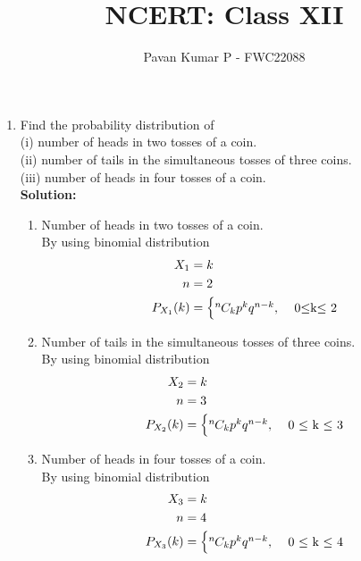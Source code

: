 \documentclass{article}
\newcommand{\solution}{\noindent \textbf{Solution: }}
\newcommand*{\permcomb}[4][0mu]{{{}^{#3}\mkern#1#2_{#4}}}
\newcommand*{\comb}[1][-1mu]{\permcomb[#1]{C}}
\begin{document}
\title{NCERT: Class XII}
\author{\Large Pavan Kumar P - FWC22088}
\date{}

\maketitle

\begin{enumerate}[label=13.\arabic{enumi}.\arabic{enumii}]

\setcounter{enumi}{3}
\setcounter{enumii}{4}

\item Find the probability distribution of\\
(i) number of heads in two tosses of a coin.\\
(ii) number of tails in the simultaneous tosses of three coins.\\
(iii) number of heads in four tosses of a coin.\\[1ex]
\solution
\begin{enumerate} 

\begin{table}[h]
 \centering
	
	\caption{Variable Description }
\end{table}
\item Number of heads in two tosses of a coin.\\
 By using binomial distribution
 \begin{align}
X_1 &= k\\ 
n &=2\\ 
  P_{X_1}(k) &=
    \begin{cases}
      \comb{n}{k}p^{k}q^{n-k}, & \text{ 0$\leq$k$\leq$ 2}\\
    \end{cases}             
\end{align}

\item Number of tails in the simultaneous tosses of three coins.\\
 By using binomial distribution\\
 \begin{align}
X_2 &= k\\ 
n&=3\\
  P_{X_2}(k) &=
    \begin{cases}
      \comb{n}{k}p^{k}q^{n-k}, & \text{ 0 $\leq$ k $\leq$ 3}\\
    \end{cases}       
\end{align}
\item Number of heads in four tosses of a coin.\\
 By using binomial distribution\\
 \begin{align}
X_3 &= k\\ 
n&=4\\
  P_{X_3}(k) &=
    \begin{cases}
      \comb{n}{k}p^{k}q^{n-k}, & \text{ 0 $\leq$ k $\leq$ 4}\\
    \end{cases}       
\end{align}
\end{enumerate}
\end{enumerate}
\end{document}
